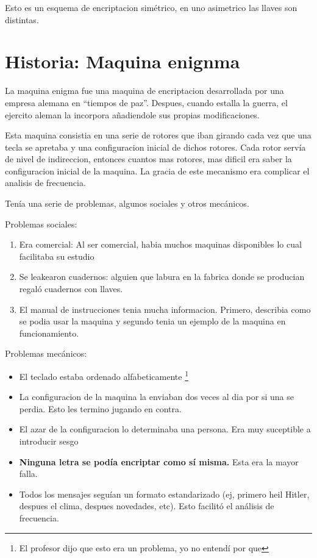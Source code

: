 \documentclass[12pt,a4paper]{report}
\begin{document}
Esto es un esquema de encriptacion simétrico, en uno asimetrico las llaves son distintas.

\section{Historia: Maquina enignma}

La maquina enigma fue una maquina de encriptacion desarrollada por una empresa alemana en ``tiempos de paz''.
Despues, cuando estalla la guerra, el ejercito aleman la incorpora añadiendole sus propias modificaciones.

Esta maquina consistia en una serie de rotores que iban girando cada vez que una tecla se apretaba y una configuracion inicial de dichos rotores. Cada rotor servía de nivel de indireccion, entonces cuantos mas rotores, mas dificil era saber la configuracion inicial de la maquina. La gracia de este mecanismo era complicar el analisis de frecuencia.


Tenía una serie de problemas, algunos sociales y otros mecánicos.

Problemas sociales:
\begin{enumerate}
  \item{Era comercial: Al ser comercial, habia muchos maquinas disponibles lo cual facilitaba su estudio}
  \item{Se leakearon cuadernos: alguien que labura en la fabrica donde se producian regaló cuadernos con llaves.}
  \item{El manual de instrucciones tenia mucha informacion. Primero, describia como se podia usar la maquina y segundo tenia un ejemplo de la maquina en funcionamiento.}
\end{enumerate}

Problemas mecánicos:
\begin{itemize}
  \item{El teclado estaba ordenado alfabeticamente \footnote{El profesor dijo que esto era un problema, yo no entendí por que}}
  \item{La configuracion de la maquina la enviaban dos veces al dia por si una se perdia. Esto les termino jugando en contra.}
  \item{El azar de la configuracion lo determinaba una persona. Era muy suceptible a introducir sesgo}
  \item{\textbf{Ninguna letra se podía encriptar como sí misma.} Esta era la mayor falla.}
  \item{Todos los mensajes seguían un formato estandarizado (ej, primero heil Hitler, despues el clima, despues novedades, etc). Esto facilitó el análisis de frecuencia.}
\end{itemize}
\end{document}
